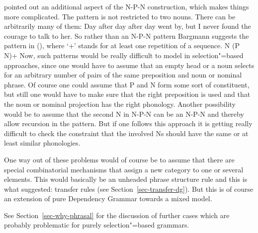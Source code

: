 \citet{Bargmann2015a} pointed out an additional aspect of the N-P-N construction, which makes things
more complicated. The pattern is not restricted to two nouns. There can be arbitrarily many of them:
\ea
Day after day after day went by, but I never found the courage to talk to her.
\z
So rather than an N-P-N pattern Bargmann suggests the pattern in (), where `+'\is{$+$} stands for at
least one repetition of a sequence.
\ea
\label{n-p-n-plus-cx}
N (P N)+
\z
Now, such patterns would be really difficult to model in selection"=based approaches, since one
would have to assume that an empty head or a noun selects for an arbitrary number of pairs of the
same preposition and noun or nominal phrase. Of course one could assume that P and N form some sort
of constituent, but still one would have to make sure that the right preposition is used and that the
noun or nominal projection has the right phonology. Another possibility would be to assume that the
second N in N-P-N can be an N-P-N and thereby allow recursion in the pattern. But if one follows
this approach it is getting really difficult to check the constraint that the involved Ns should
have the same or at least similar phonologies.

One way out of these problems would of course be to assume that there are special combinatorial
mechanisms that assign a new category to one or several elements. This would basically be an
unheaded phrase structure rule and this is what \tes suggested: transfer rules (see
Section~\ref{sec-transfer-dg}). But this is of course an extension of pure Dependency Grammar
towards a mixed model.

See Section~\ref{sec-why-phrasal} for the discussion of further cases which are probably problematic
for purely selection"=based grammars.

\vspace{\baselineskip}

